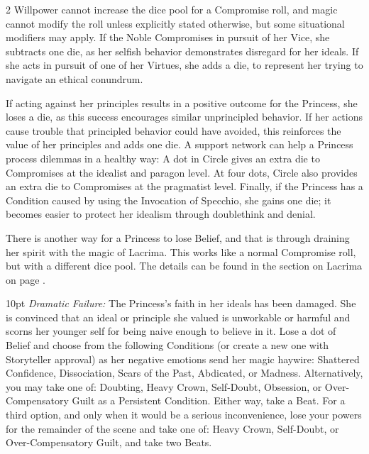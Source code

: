 \begin{multicols}{2}
Willpower cannot increase the dice pool for a Compromise roll, and magic cannot modify the roll unless explicitly stated otherwise, but some situational modifiers may apply. If the Noble Compromises in pursuit of her Vice, she subtracts one die, as her selfish behavior demonstrates disregard for her ideals. If she acts in pursuit of one of her Virtues, she adds a die, to represent her trying to navigate an ethical conundrum. 

If acting against her principles results in a positive outcome for the Princess, she loses a die, as this success encourages similar unprincipled behavior. If her actions cause trouble that principled behavior could have avoided, this reinforces the value of her principles and adds one die. A support network can help a Princess process dilemmas in a healthy way: A dot in Circle gives an extra die to Compromises at the idealist and paragon level. At four dots, Circle also provides an extra die to Compromises at the pragmatist level. Finally, if the Princess has a Condition caused by using the Invocation of Specchio, she gains one die; it becomes easier to protect her idealism through doublethink and denial. 

There is another way for a Princess to lose Belief, and that is through draining her spirit with the magic of Lacrima. This works like a normal Compromise roll, but with a different dice pool. The details can be found in the section on Lacrima on page \pageref{LacrimaRef}. 

\begin{myindentpar}{10pt}
\emph{Dramatic Failure:} The Princess's faith in her ideals has been damaged. She is convinced that an ideal or principle she valued is unworkable or harmful and scorns her younger self for being naive enough to believe in it. Lose a dot of Belief and choose from the following Conditions (or create a new one with Storyteller approval) as her negative emotions send her magic haywire: Shattered Confidence, Dissociation, Scars of the Past, Abdicated, or Madness. Alternatively, you may take one of: Doubting, Heavy Crown, Self-Doubt, Obsession, or Over-Compensatory Guilt as a Persistent Condition. Either way, take a Beat. For a third option, and only when it would be a serious inconvenience, lose your powers for the remainder of the scene and take one of: Heavy Crown, Self-Doubt, or Over-Compensatory Guilt, and take two Beats. 


\end{myindentpar}
\end{multicols}
